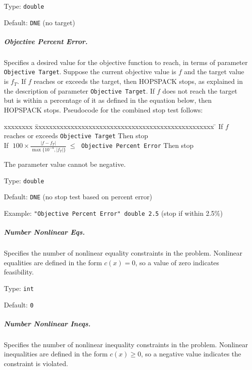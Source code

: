 \hspace{0.2in}
Type: {\tt double}

\hspace{0.2in}
Default: {\tt DNE} (no target)

\subparagraph{Objective Percent Error.}  \label{param:PD-objpcnt}
Specifies a desired value for the objective function to reach,
in terms of parameter {\tt Objective Target}.  Suppose the current objective
value is $f$ and the target value is $f_T$.  If $f$ reaches or exceeds the
target, then HOPSPACK stops, as explained in the description of parameter
{\tt Objective Target}.  If $f$ does not reach the target but is within a
percentage of it as defined in the equation below, then HOPSPACK stops.
Pseudocode for the combined stop test follows:
\begin{tabbing}
  xxxxxxxx \= xxxxxxxxxxxxxxxxxxxxxxxxxxxxxxxxxxxxxxxxxxxxxxxxxx \= \kill
     \> If $f$ reaches or exceeds {\tt Objective Target}
        \> Then stop  \\
     \> If $\; 100 \times
                \displaystyle \frac{| f - f_T |}{\max \{ 10^{-4}, | f_T | \}}
             \; \leq \;$ {\tt Objective Percent Error}
        \> Then stop
\end{tabbing}
The parameter value cannot be negative.

\hspace{0.2in}
Type: {\tt double}

\hspace{0.2in}
Default: {\tt DNE} (no stop test based on percent error)

\hspace{0.2in}
Example: {\tt "Objective Percent Error" double 2.5} (stop if within 2.5\%)

\subparagraph{Number Nonlinear Eqs.}  \label{param:PD-numeqs}
Specifies the number of nonlinear equality constraints in the problem.
Nonlinear equalities are defined in the form $c(x) = 0$, so a value of zero
indicates feasibility.

\hspace{0.2in}
Type: {\tt int}

\hspace{0.2in}
Default: {\tt 0}

\subparagraph{Number Nonlinear Ineqs.}  \label{param:PD-numineqs}
Specifies the number of nonlinear inequality constraints in the problem.
Nonlinear inequalities are defined in the form $c(x) \geq 0$, so a negative
value indicates the constraint is violated.

